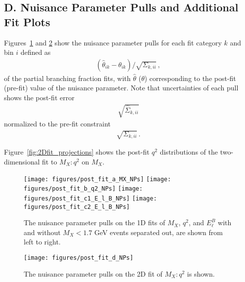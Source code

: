 \documentclass[twocolumn,aps,prd,superscriptaddress,nofootinbib,floatfix,preprintnumbers,a4]{revtex4-1}
\begin{document}
\begin{appendix}
\clearpage

\section*{D. Nuisance Parameter Pulls and Additional Fit Plots} \label{app:NPs}

Figures~\ref{fig:NP1} and \ref{fig:NP2} show the nuisance parameter pulls for each fit category $k$ and bin $i$ defined as 
\begin{align}
 \left( \widehat \theta_{ik} -  \theta_{ik}  \right) / \sqrt{ \Sigma_{k,ii}}  \, ,
 \end{align}
 of the partial branching fraction fits, with $\widehat \theta$ ($\theta$) corresponding to the post-fit (pre-fit) value of the nuisance parameter. Note that uncertainties of each pull shows the post-fit error 
 \begin{align}
 \sqrt{ \widehat \Sigma_{k,ii}}
 \end{align}
  normalized to the pre-fit constraint 
  \begin{align}
  \sqrt{ \Sigma_{k,ii}} \, .
  \end{align}

Figure~\ref{fig:2Dfit_projections} shows the post-fit $q^2$ distributions of the two-dimensional fit to $M_X:q^2$ on $M_{X}$. 


\begin{figure}[h!]
  \texttt{[image: figures/post\_fit\_a\_MX\_NPs]} 
  \texttt{[image: figures/post\_fit\_b\_q2\_NPs]}  
  \texttt{[image: figures/post\_fit\_c1\_E\_l\_B\_NPs]} 
  \texttt{[image: figures/post\_fit\_c2\_E\_l\_B\_NPs]} \\
\caption{
  The nuisance parameter pulls on the 1D fits of $M_X$, $q^2$, and $E_\ell^B$ with and without $M_X < 1.7$ GeV events separated out, are shown from left to right.
 }
\label{fig:NP1}
\end{figure}  

\begin{figure}[h!]
 \texttt{[image: figures/post\_fit\_d\_NPs]} 
\caption{
  The nuisance parameter pulls on the 2D fit of $M_X:q^2$ is shown.
 }
\label{fig:NP2}
\end{figure}  


\end{appendix}
\end{document}
